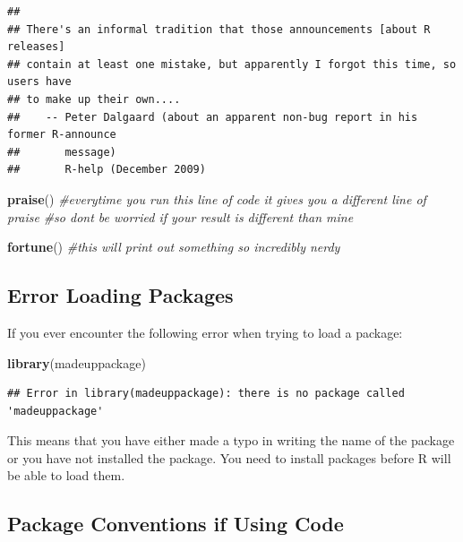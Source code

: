 \documentclass[
]{book}
\newenvironment{Shaded}{\begin{snugshade}}{\end{snugshade}}
\newcommand{\CommentTok}[1]{\textcolor[rgb]{0.56,0.35,0.01}{\textit{#1}}}
\newcommand{\FunctionTok}[1]{\textcolor[rgb]{0.13,0.29,0.53}{\textbf{#1}}}
\newcommand{\NormalTok}[1]{#1}
\begin{document}
\begin{verbatim}
## 
## There's an informal tradition that those announcements [about R releases]
## contain at least one mistake, but apparently I forgot this time, so users have
## to make up their own....
##    -- Peter Dalgaard (about an apparent non-bug report in his former R-announce
##       message)
##       R-help (December 2009)
\end{verbatim}

\begin{Shaded}
\begin{Highlighting}[]
\FunctionTok{praise}\NormalTok{() }\CommentTok{\#everytime you run this line of code it gives you a different line of praise}
\CommentTok{\#so don\textquotesingle{}t be worried if your result is different than mine}

\FunctionTok{fortune}\NormalTok{() }\CommentTok{\#this will print out something so incredibly nerdy }
\end{Highlighting}
\end{Shaded}

\hypertarget{error-loading-packages}{%
\subsection{Error Loading Packages}\label{error-loading-packages}}

If you ever encounter the following error when trying to load a package:

\begin{Shaded}
\begin{Highlighting}[]
\FunctionTok{library}\NormalTok{(madeuppackage)}
\end{Highlighting}
\end{Shaded}

\begin{verbatim}
## Error in library(madeuppackage): there is no package called 'madeuppackage'
\end{verbatim}

This means that you have either made a typo in writing the name of the package or you have not installed the package. You need to install packages before R will be able to load them.

\hypertarget{package-conventions-if-using-code}{%
\subsection{Package Conventions if Using Code}\label{package-conventions-if-using-code}}
\end{document}
